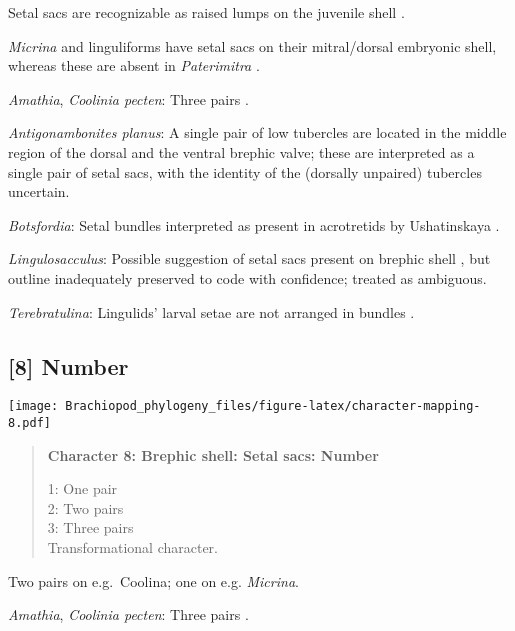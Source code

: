 \documentclass[openany]{book}
\theoremstyle{definition}
\theoremstyle{definition}
\theoremstyle{definition}
\theoremstyle{remark}
\begin{document}
Setal sacs are recognizable as raised lumps on the juvenile shell
\citep[see][]{Bassett2017Earliestontogeny}.

\emph{Micrina} and linguliforms have setal sacs on their mitral/dorsal
embryonic shell, whereas these are absent in \emph{Paterimitra}
\citep{Holmer2011Firstrecord}.

\hypertarget{Amathia-coding-7}{}
\emph{Amathia}, \emph{Coolinia pecten}: Three pairs
\citep{Carlson1995Phylogeneticrelationships}.

\hypertarget{Antigonambonites_planus-coding-7}{}
\emph{Antigonambonites planus}: A single pair of low tubercles are
\citep[ state ``may be'']{Ushatinskaya2016Revisionof} located in the
middle region of the dorsal and the ventral brephic valve; these are
interpreted as a single pair of setal sacs, with the identity of the
(dorsally unpaired) tubercles uncertain.

\hypertarget{Botsfordia-coding-7}{}
\emph{Botsfordia}: Setal bundles interpreted as present in acrotretids
by Ushatinskaya \citeyearpar{Ushatinskaya2016Protegulumand}.

\hypertarget{Lingulosacculus-coding-7}{}
\emph{Lingulosacculus}: Possible suggestion of setal sacs present on
brephic shell \citep{Holmer1997EarlyCambrian, Li2004}, but outline
inadequately preserved to code with confidence; treated as ambiguous.

\hypertarget{Terebratulina-coding-7}{}
\emph{Terebratulina}: Lingulids' larval setae are not arranged in
bundles \citep{Carlson1995Phylogeneticrelationships}.

\subsection*{{[}8{]} Number}\label{number}

\texttt{[image: Brachiopod\_phylogeny\_files/figure-latex/character-mapping-8.pdf]}

\begin{quote}
\textbf{Character 8: Brephic shell: Setal sacs: Number}

1: One pair\\
2: Two pairs\\
3: Three pairs\\
Transformational character.
\end{quote}

Two pairs on e.g.~Coolina; one on e.g. \emph{Micrina}.

\hypertarget{Amathia-coding-8}{}
\emph{Amathia}, \emph{Coolinia pecten}: Three pairs
\citep{Carlson1995Phylogeneticrelationships}.
\end{document}
